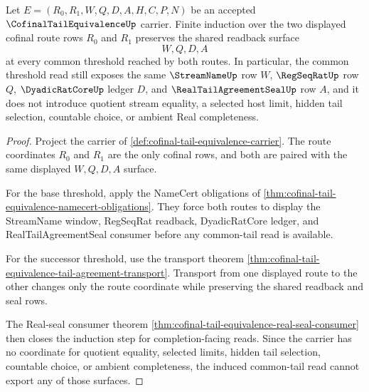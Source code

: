 \begin{theorem}
\label{thm:cofinal-tail-equivalence-common-tail-induction}
Let $E=(R_0,R_1,W,Q,D,A,H,C,P,N)$ be an accepted $\CofinalTailEquivalenceUp$ carrier. Finite induction over the two displayed cofinal route rows $R_0$ and $R_1$ preserves the shared readback surface
$$
W,Q,D,A
$$
at every common threshold reached by both routes. In particular, the common threshold read still exposes the same $\StreamNameUp$ row $W$, $\RegSeqRatUp$ row $Q$, $\DyadicRatCoreUp$ ledger $D$, and $\RealTailAgreementSealUp$ row $A$, and it does not introduce quotient stream equality, a selected host limit, hidden tail selection, countable choice, or ambient Real completeness.
\end{theorem}
\begin{proof}
Project the carrier of \autoref{def:cofinal-tail-equivalence-carrier}. The route coordinates $R_0$ and $R_1$ are the only cofinal rows, and both are paired with the same displayed $W,Q,D,A$ surface.

For the base threshold, apply the NameCert obligations of \autoref{thm:cofinal-tail-equivalence-namecert-obligations}. They force both routes to display the StreamName window, RegSeqRat readback, DyadicRatCore ledger, and RealTailAgreementSeal consumer before any common-tail read is available.

For the successor threshold, use the transport theorem \autoref{thm:cofinal-tail-equivalence-tail-agreement-transport}. Transport from one displayed route to the other changes only the route coordinate while preserving the shared readback and seal rows.

The Real-seal consumer theorem \autoref{thm:cofinal-tail-equivalence-real-seal-consumer} then closes the induction step for completion-facing reads. Since the carrier has no coordinate for quotient equality, selected limits, hidden tail selection, countable choice, or ambient completeness, the induced common-tail read cannot export any of those surfaces.
\end{proof}

